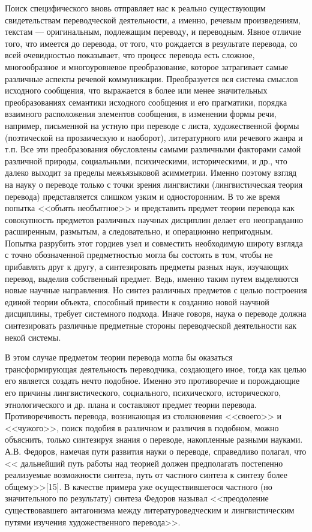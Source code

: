 Поиск специфического вновь отправляет нас к реально существующим свидетельствам переводческой деятельности, а именно, речевым произведениям, текстам --- оригинальным, подлежащим переводу, и переводным. Явное отличие того, что имеется до перевода, от того, что рождается в результате перевода, со всей очевидностью показывает, что процесс перевода есть сложное, многообразное и многоуровневое преобразование, которое затрагивает самые различные аспекты речевой коммуникации. Преобразуется вся система смыслов исходного сообщения, что выражается в более или менее значительных преобразованиях семантики исходного сообщения и его прагматики, порядка взаимного расположения элементов сообщения, в изменении формы речи, например, письменной на устную при переводе с листа, художественной формы (поэтической на прозаическую и наоборот), литературного или речевого жанра и т.п. Все эти преобразования обусловлены самыми различными факторами самой различной природы, социальными, психическими, историческими, и др., что далеко выходит за пределы межъязыковой асимметрии. Именно поэтому взгляд на науку о переводе только с точки зрения лингвистики (лингвистическая теория перевода) представляется слишком узким и односторонним. В то же время попытка <<объять необъятное>> и представить предмет теории перевода как совокупность предметов различных научных дисциплин делает его неоправданно расширенным, размытым, а следовательно, и операционно непригодным. Попытка разрубить этот гордиев узел и совместить необходимую широту взгляда с точно обозначенной предметностью могла бы состоять в том, чтобы не прибавлять друг к другу, а синтезировать предметы разных наук, изучающих перевод, выделив собственный предмет. Ведь, именно таким путем выделяются новые научные направления. Но синтез различных предметов с целью построения единой теории объекта, способный привести к созданию новой научной дисциплины, требует системного подхода. Иначе говоря, наука о переводе должна синтезировать различные предметные стороны переводческой деятельности как некой системы.

В этом случае предметом теории перевода могла бы оказаться трансформирующая деятельность переводчика, создающего иное, тогда как целью его является создать нечто подобное. Именно это противоречие и порождающие его причины лингвистического, социального, психического, исторического, этнологического и др. плана и составляют предмет теории перевода. Противоречивость перевода, возникающая из столкновения <<своего>> и <<чужого>>, поиск подобия в различном и различия в подобном, можно объяснить, только синтезируя знания о переводе, накопленные разными науками. А.В. Федоров, намечая пути развития науки о переводе, справедливо полагал, что << дальнейший путь работы над теорией должен предполагать постепенно реализуемые возможности синтеза, путь от частного синтеза к синтезу более общему>>[15]. В качестве примера уже осуществившегося частного (но значительного по результату) синтеза Федоров называл <<преодоление существовавшего антагонизма между литературоведческим и лингвистическим путями изучения художественного перевода>>.

